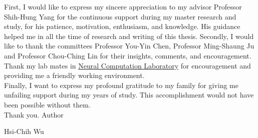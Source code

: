 First, I would like to express my sincere appreciation to my advisor Professor Shih-Hung Yang for the continuous support during my master research and study, for his patience, motivation, enthusiasm, and knowledge.
His guidance helped me in all the time of research and writing of this thesis. 
Secondly, I would like to thank the committees Professor You-Yin Chen, Professor Ming-Shaung Ju and Professor Chou-Ching Lin for their insights, comments, and encouragement. 
\\

Thank my lab mates in \href{https://nckunclab.wixsite.com/neuralcomputationlab}{Neural Computation Laboratory} for encouragement and providing me a friendly working environment.
\\

Finally, I want to express my profound gratitude to my family for giving me unfailing support during my years of study. 
This accomplishment would not have been possible without them.
\\

Thank you.
\newline
\newline
\noindent Author

\noindent Hsi-Chih Wu

